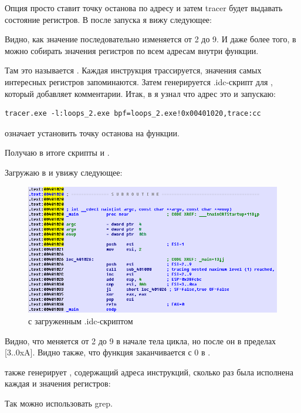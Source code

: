 Опция  просто ставит точку останова по адресу и затем tracer будет выдавать состояние регистров.
В  после запуска я вижу следующее:



Видно, как значение \ESI последовательно изменяется от 2 до 9.
И даже более того, в \tracer можно собирать значения регистров по всем адресам внутри функции.

Там это называется .
Каждая инструкция трассируется, значения самых интересных регистров запоминаются.
Затем генерируется .idc-скрипт для \IDA, который добавляет комментарии.
Итак, в \IDA я узнал что адрес \main это  и запускаю:

\begin{lstlisting}
tracer.exe -l:loops_2.exe bpf=loops_2.exe!0x00401020,trace:cc
\end{lstlisting}

 означает установить точку останова на функции.

Получаю в итоге скрипты  и .

\clearpage
Загружаю  в \IDA и увижу следующее:

\begin{figure}[H]
\centering
\includegraphics[scale=\FigScale]{patterns/09_loops/simple/IDA_tracer_cc.png}
\caption{\IDA с загруженным .idc-скриптом}
\label{fig:loops_IDA_tracer}
\end{figure}

Видно, что \ESI меняется от 2 до 9 в начале тела цикла, но после 
 он в пределах [3..0xA].
Видно также, что функция \main заканчивается с 0 в \EAX.

\tracer также генерирует , 
содержащий адреса инструкций, сколько раз была исполнена
каждая и значения регистров:


\index{\GrepUsage}
Так можно использовать grep.

\fi
